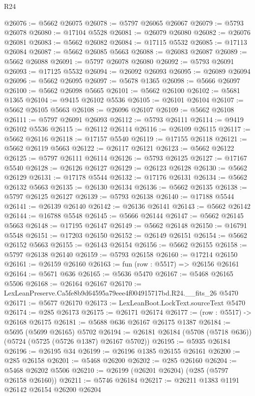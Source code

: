 \begin{lexlean}{R24}
\begin{coremodule}
@26076 := @5662 @26075
@26078 := @5797 @26065 @26067
@26079 := @5793 @26078
@26080 := @17104 @5528
@26081 := @26079 @26080
@26082 := @26076 @26081
@26083 := @5662 @26082
@26084 := @17115 @5532
@26085 := @17113 @26084
@26087 := @5662 @26085 @5663
@26088 := @26083 @26087
@26089 := @5662 @26088
@26091 := @5797 @26078 @26080
@26092 := @5793 @26091
@26093 := @17125 @5532
@26094 := @26092 @26093
@26095 := @26089 @26094
@26096 := @5662 @26095
@26097 := @5678 @1365
@26098 := @5666 @26097
@26100 := @5662 @26098 @5665
@26101 := @5662 @26100
@26102 := @5681 @1365
@26104 := @9415 @26102 @5536
@26105 := @26101 @26104
@26107 := @5662 @26105 @5663
@26108 := @26096 @26107
@26109 := @5662 @26108
@26111 := @5797 @26091 @26093
@26112 := @5793 @26111
@26114 := @9419 @26102 @5536
@26115 := @26112 @26114
@26116 := @26109 @26115
@26117 := @5662 @26116
@26118 := @17157 @5540
@26119 := @17155 @26118
@26121 := @5662 @26119 @5663
@26122 := @26117 @26121
@26123 := @5662 @26122
@26125 := @5797 @26111 @26114
@26126 := @5793 @26125
@26127 := @17167 @5540
@26128 := @26126 @26127
@26129 := @26123 @26128
@26130 := @5662 @26129
@26131 := @17178 @5544
@26132 := @17176 @26131
@26134 := @5662 @26132 @5663
@26135 := @26130 @26134
@26136 := @5662 @26135
@26138 := @5797 @26125 @26127
@26139 := @5793 @26138
@26140 := @17188 @5544
@26141 := @26139 @26140
@26142 := @26136 @26141
@26143 := @5662 @26142
@26144 := @16788 @5548
@26145 := @5666 @26144
@26147 := @5662 @26145 @5663
@26148 := @17195 @26147
@26149 := @5662 @26148
@26150 := @16791 @5548
@26151 := @17203 @26150
@26152 := @26149 @26151
@26154 := @5662 @26152 @5663
@26155 := @26143 @26154
@26156 := @5662 @26155
@26158 := @5797 @26138 @26140
@26159 := @5793 @26158
@26160 := @17214 @26150
@26161 := @26159 @26160
@26163 := fun (row : @5517) => @26156 @26161
@26164 := @5671 @636
@26165 := @5636 @5470
@26167 := @5468 @26165 @5506
@26168 := @26164 @26167
@26170 := LexLeanPreserve.Ca5fe8b9d64595a79eee4f004915717bd.R24.__fits_26 @5470
@26171 := @5677 @26170
@26173 := LexLeanBoot.LockText.sourceText @5470
@26174 := @285 @26173
@26175 := @26171 @26174
@26177 := (row : @5517) -> @26168 @26175
@26181 := @5688 @636 @26167 @26175 @1387
@26184 := @5695 (@5699 @26165) @5702
@26194 := @26181 @26184 (@5708 (@5718 @636)) (@5724 (@5725 (@5726 @1387) @26167 @5702))
@26195 := @5935 @26184
@26196 := @26195 @34
@26199 := @26196 @1385 @26155 @26161
@26200 := @285 @26158
@26201 := @5468 @26200
@26202 := @285 @26160
@26204 := @5468 @26202 @5506
@26210 := @26199 (@26201 @26204) (@285 (@5797 @26158 @26160))
@26211 := @5746 @26184
@26217 := @26211 @1383 @1191 @26142 @26154 @26200 @26204

\end{coremodule}
\end{lexlean}
